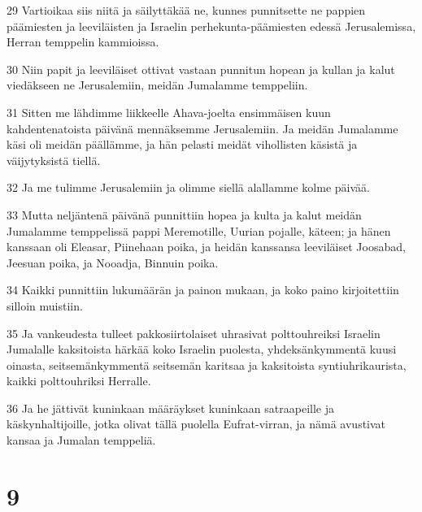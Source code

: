 \par 29 Vartioikaa siis niitä ja säilyttäkää ne, kunnes punnitsette ne pappien päämiesten ja leeviläisten ja Israelin perhekunta-päämiesten edessä Jerusalemissa, Herran temppelin kammioissa.
\par 30 Niin papit ja leeviläiset ottivat vastaan punnitun hopean ja kullan ja kalut viedäkseen ne Jerusalemiin, meidän Jumalamme temppeliin.
\par 31 Sitten me lähdimme liikkeelle Ahava-joelta ensimmäisen kuun kahdentenatoista päivänä mennäksemme Jerusalemiin. Ja meidän Jumalamme käsi oli meidän päällämme, ja hän pelasti meidät vihollisten käsistä ja väijytyksistä tiellä.
\par 32 Ja me tulimme Jerusalemiin ja olimme siellä alallamme kolme päivää.
\par 33 Mutta neljäntenä päivänä punnittiin hopea ja kulta ja kalut meidän Jumalamme temppelissä pappi Meremotille, Uurian pojalle, käteen; ja hänen kanssaan oli Eleasar, Piinehaan poika, ja heidän kanssansa leeviläiset Joosabad, Jeesuan poika, ja Nooadja, Binnuin poika.
\par 34 Kaikki punnittiin lukumäärän ja painon mukaan, ja koko paino kirjoitettiin silloin muistiin.
\par 35 Ja vankeudesta tulleet pakkosiirtolaiset uhrasivat polttouhreiksi Israelin Jumalalle kaksitoista härkää koko Israelin puolesta, yhdeksänkymmentä kuusi oinasta, seitsemänkymmentä seitsemän karitsaa ja kaksitoista syntiuhrikaurista, kaikki polttouhriksi Herralle.
\par 36 Ja he jättivät kuninkaan määräykset kuninkaan satraapeille ja käskynhaltijoille, jotka olivat tällä puolella Eufrat-virran, ja nämä avustivat kansaa ja Jumalan temppeliä.

\chapter{9}

